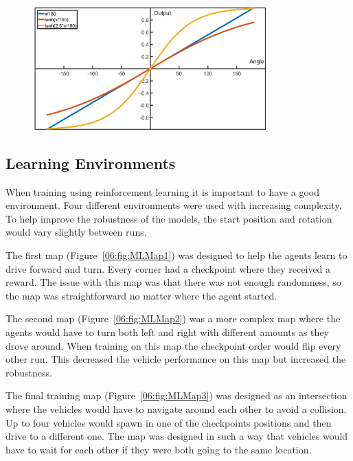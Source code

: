 


\begin{figure}[h]
    \centering
    \includegraphics[width=0.8\textwidth]{06_Implementation/00_MLAgents/Images/anglePlot.png}
    \caption{} \label{06:anglePlot}
\end{figure}

\subsection{Learning Environments}
When training using reinforcement learning it is important to have a good environment. Four different environments were used with increasing complexity. To help improve the robustness of the models, the start position and rotation would vary slightly between runs. 

The first map (Figure~\ref{06:fig:MLMap1}) was designed to help the agents learn to drive forward and turn. Every corner had a checkpoint where they received a reward. The issue with this map was that there was not enough randomness, so the map was straightforward no matter where the agent started. 

The second map (Figure~\ref{06:fig:MLMap2}) was a more complex map where the agents would have to turn both left and right with different amounts as they drove around. When training on this map the checkpoint order would flip every other run. This decreased the vehicle performance on this map but increased the robustness. 

The final training map (Figure~\ref{06:fig:MLMap3}) was designed as an intersection where the vehicles would have to navigate around each other to avoid a collision. Up to four vehicles would spawn in one of the checkpoints positions and then drive to a different one. The map was designed in such a way that vehicles would have to wait for each other if they were both going to the same location. 

